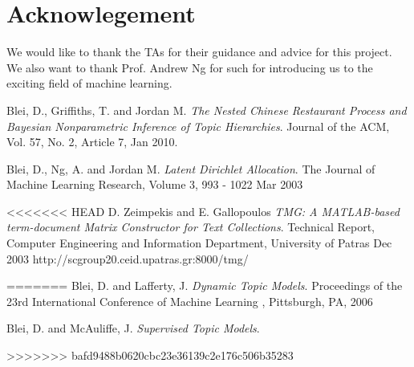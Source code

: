 \documentclass[DIV=calc, paper=a4, fontsize=11pt, twocolumn]{scrartcl}	 %
\begin{document}
\section*{Acknowlegement}
We would like to thank the TAs for their guidance and advice for this project. We also want to thank Prof. Andrew Ng for such for introducing us to the exciting field of machine learning.  

\begin{thebibliography}{99}

  Blei, D., Griffiths, T. and Jordan M.
  \emph{The Nested Chinese Restaurant Process and Bayesian Nonparametric Inference of Topic Hierarchies}.
  Journal of the ACM, Vol. 57, No. 2, Article 7,
 Jan 2010.
 
  Blei, D., Ng, A. and Jordan M.
  \emph{Latent Dirichlet Allocation}.
  The Journal of Machine Learning Research,
 Volume 3, 993 - 1022
 Mar 2003
 
<<<<<<< HEAD
  D. Zeimpekis and E. Gallopoulos
  \emph{TMG: A MATLAB-based term-document Matrix Constructor for Text Collections}.
  Technical Report, Computer Engineering and Information Department, University of Patras
  Dec 2003
  http://scgroup20.ceid.upatras.gr:8000/tmg/

=======
  Blei, D. and Lafferty, J.
  \emph{Dynamic Topic Models}.
  Proceedings of the 23rd International Conference of Machine Learning ,
 Pittsburgh, PA,
 2006
 
  Blei, D. and McAuliffe, J.
  \emph{Supervised Topic Models}.
 
>>>>>>> bafd9488b0620cbc23e36139c2e176c506b35283
\end{thebibliography}
\end{document}
